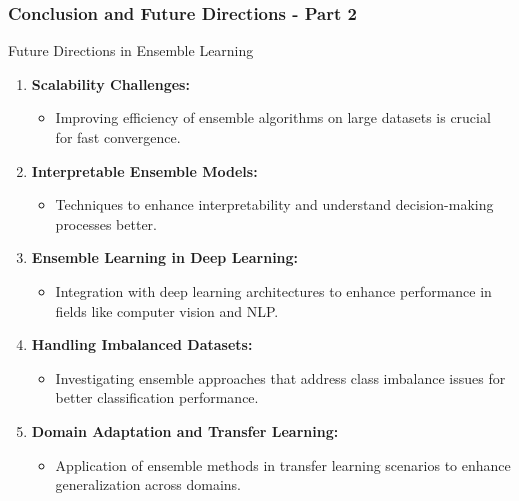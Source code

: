 \documentclass[aspectratio=169]{beamer}
\begin{document}
\begin{frame}[fragile]
  \frametitle{Conclusion and Future Directions - Part 2}
  \begin{block}{Future Directions in Ensemble Learning}
    \begin{enumerate}
      \item \textbf{Scalability Challenges:}
      \begin{itemize}
          \item Improving efficiency of ensemble algorithms on large datasets is crucial for fast convergence.
      \end{itemize}
      \item \textbf{Interpretable Ensemble Models:}
      \begin{itemize}
          \item Techniques to enhance interpretability and understand decision-making processes better.
      \end{itemize}
      \item \textbf{Ensemble Learning in Deep Learning:}
      \begin{itemize}
          \item Integration with deep learning architectures to enhance performance in fields like computer vision and NLP.
      \end{itemize}
      \item \textbf{Handling Imbalanced Datasets:}
      \begin{itemize}
          \item Investigating ensemble approaches that address class imbalance issues for better classification performance.
      \end{itemize}
      \item \textbf{Domain Adaptation and Transfer Learning:}
      \begin{itemize}
          \item Application of ensemble methods in transfer learning scenarios to enhance generalization across domains.
      \end{itemize}
    \end{enumerate}
  \end{block}
\end{frame}
\end{document}
